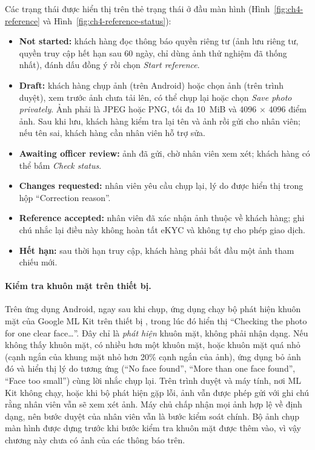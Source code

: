 Các trạng thái được hiển thị trên thẻ trạng thái ở đầu màn hình (Hình~\ref{fig:ch4-reference} và Hình~\ref{fig:ch4-reference-status}):
\begin{itemize}
  \item \textbf{Not started:} khách hàng đọc thông báo quyền riêng tư (ảnh lưu riêng tư, quyền truy cập hết hạn sau 60 ngày, chỉ dùng ảnh thử nghiệm đã thống nhất), đánh dấu đồng ý rồi chọn \textit{Start reference}.
  \item \textbf{Draft:} khách hàng chụp ảnh (trên Android) hoặc chọn ảnh (trên trình duyệt), xem trước ảnh chưa tải lên, có thể chụp lại hoặc chọn \textit{Save photo privately}. Ảnh phải là JPEG hoặc PNG, tối đa 10~MiB và 4096 $\times$ 4096 điểm ảnh. Sau khi lưu, khách hàng kiểm tra lại tên và ảnh rồi gửi cho nhân viên; nếu tên sai, khách hàng cần nhân viên hỗ trợ sửa.
  \item \textbf{Awaiting officer review:} ảnh đã gửi, chờ nhân viên xem xét; khách hàng có thể bấm \textit{Check status}.
  \item \textbf{Changes requested:} nhân viên yêu cầu chụp lại, lý do được hiển thị trong hộp ``Correction reason''.
  \item \textbf{Reference accepted:} nhân viên đã xác nhận ảnh thuộc về khách hàng; ghi chú nhắc lại điều này không hoàn tất eKYC và không tự cho phép giao dịch.
  \item \textbf{Hết hạn:} sau thời hạn truy cập, khách hàng phải bắt đầu một ảnh tham chiếu mới.
\end{itemize}

\paragraph{Kiểm tra khuôn mặt trên thiết bị.} Trên ứng dụng Android, ngay sau khi chụp, ứng dụng chạy bộ phát hiện khuôn mặt của Google ML Kit trên thiết bị \parencite{ch2-mlkit-face}, trong lúc đó hiển thị ``Checking the photo for one clear face\ldots''. Đây chỉ là \emph{phát hiện} khuôn mặt, không phải nhận dạng. Nếu không thấy khuôn mặt, có nhiều hơn một khuôn mặt, hoặc khuôn mặt quá nhỏ (cạnh ngắn của khung mặt nhỏ hơn 20\% cạnh ngắn của ảnh), ứng dụng bỏ ảnh đó và hiển thị lý do tương ứng (``No face found'', ``More than one face found'', ``Face too small'') cùng lời nhắc chụp lại. Trên trình duyệt và máy tính, nơi ML Kit không chạy, hoặc khi bộ phát hiện gặp lỗi, ảnh vẫn được phép gửi với ghi chú rằng nhân viên vẫn sẽ xem xét ảnh. Máy chủ chấp nhận mọi ảnh hợp lệ về định dạng, nên bước duyệt của nhân viên vẫn là bước kiểm soát chính. Bộ ảnh chụp màn hình được dựng trước khi bước kiểm tra khuôn mặt được thêm vào, vì vậy chương này chưa có ảnh của các thông báo trên.

